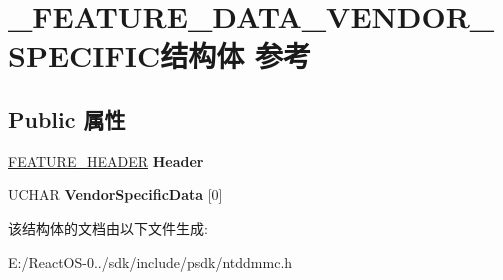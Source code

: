 \hypertarget{struct___f_e_a_t_u_r_e___d_a_t_a___v_e_n_d_o_r___s_p_e_c_i_f_i_c}{}\section{\+\_\+\+F\+E\+A\+T\+U\+R\+E\+\_\+\+D\+A\+T\+A\+\_\+\+V\+E\+N\+D\+O\+R\+\_\+\+S\+P\+E\+C\+I\+F\+I\+C结构体 参考}
\label{struct___f_e_a_t_u_r_e___d_a_t_a___v_e_n_d_o_r___s_p_e_c_i_f_i_c}
\subsection*{Public 属性}
\begin{DoxyCompactItemize}
\item 
\mbox{\label{struct___f_e_a_t_u_r_e___d_a_t_a___v_e_n_d_o_r___s_p_e_c_i_f_i_c_ae2a290a663297143becf8285356410ca}} 
\hyperlink{struct___f_e_a_t_u_r_e___h_e_a_d_e_r}{F\+E\+A\+T\+U\+R\+E\+\_\+\+H\+E\+A\+D\+ER} {\bfseries Header}
\item 
\mbox{\label{struct___f_e_a_t_u_r_e___d_a_t_a___v_e_n_d_o_r___s_p_e_c_i_f_i_c_aac8a81bc754fe260a854e4e9dd16de98}} 
U\+C\+H\+AR {\bfseries Vendor\+Specific\+Data} \mbox{[}0\mbox{]}
\end{DoxyCompactItemize}


该结构体的文档由以下文件生成\+:\begin{DoxyCompactItemize}
\item 
E\+:/\+React\+O\+S-\/0../sdk/include/psdk/ntddmmc.\+h\end{DoxyCompactItemize}
